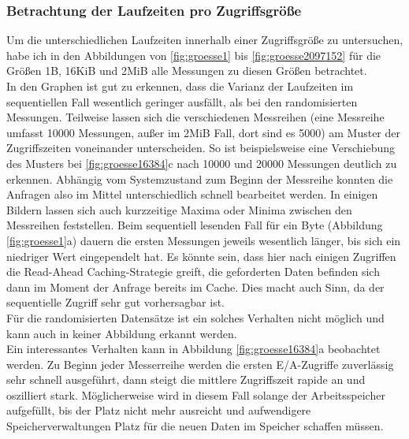 \documentclass[
	12pt,
	a4paper,
	BCOR10mm,
	DIV14,
	listof=totoc,
	bibliography=totoc,
	headsepline
]{scrreprt}
\begin{document}
\subsubsection{Betrachtung der Laufzeiten pro Zugriffsgröße}
Um die unterschiedlichen Laufzeiten innerhalb einer Zugriffsgröße zu untersuchen, habe ich in den Abbildungen von \ref{fig:groesse1} bis \ref{fig:groesse2097152} für die Größen 1B, 16KiB und 2MiB alle Messungen zu diesen Größen betrachtet.\\
In den Graphen ist gut zu erkennen, dass die Varianz der Laufzeiten im sequentiellen Fall wesentlich geringer ausfällt, als bei den randomisierten Messungen.
Teilweise lassen sich die verschiedenen Messreihen (eine Messreihe umfasst 10000 Messungen, außer im 2MiB Fall, dort sind es 5000) am Muster der Zugriffszeiten voneinander unterscheiden.
So ist beispielsweise eine Verschiebung des Musters bei \ref{fig:groesse16384}c nach 10000 und 20000 Messungen deutlich zu erkennen.
Abhängig vom Systemzustand zum Beginn der Messreihe konnten die Anfragen also im Mittel unterschiedlich schnell bearbeitet werden.
In einigen Bildern lassen sich auch kurzzeitige Maxima oder Minima zwischen den Messreihen feststellen.
Beim sequentiell lesenden Fall für ein Byte (Abbildung \ref{fig:groesse1}a) dauern die ersten Messungen jeweils wesentlich länger, bis sich ein niedriger Wert eingependelt hat. Es könnte sein, dass hier nach einigen Zugriffen die Read-Ahead Caching-Strategie greift, die geforderten Daten befinden sich dann im Moment der Anfrage bereits im Cache. Dies macht auch Sinn, da der sequentielle Zugriff sehr gut vorhersagbar ist.\\
Für die randomisierten Datensätze ist ein solches Verhalten nicht möglich und kann auch in keiner Abbildung erkannt werden.\\
Ein interessantes Verhalten kann in Abbildung \ref{fig:groesse16384}a beobachtet werden.
Zu Beginn jeder Messerreihe werden die ersten E/A-Zugriffe zuverlässig sehr schnell ausgeführt, dann steigt die mittlere Zugriffszeit rapide an und oszilliert stark.
Möglicherweise wird in diesem Fall solange der Arbeitsspeicher aufgefüllt, bis der Platz nicht mehr ausreicht und aufwendigere Speicherverwaltungen Platz für die neuen Daten im Speicher schaffen müssen.
\end{document}
